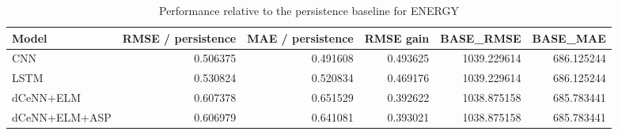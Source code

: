 \begin{table}
\caption{Performance relative to the persistence baseline for ENERGY}
\begin{tabular}{lrrrrr}
\toprule
Model & RMSE / persistence & MAE / persistence & RMSE gain & BASE\_RMSE & BASE\_MAE \\
\midrule
CNN & 0.506375 & 0.491608 & 0.493625 & 1039.229614 & 686.125244 \\
LSTM & 0.530824 & 0.520834 & 0.469176 & 1039.229614 & 686.125244 \\
dCeNN+ELM & 0.607378 & 0.651529 & 0.392622 & 1038.875158 & 685.783441 \\
dCeNN+ELM+ASP & 0.606979 & 0.641081 & 0.393021 & 1038.875158 & 685.783441 \\
\bottomrule
\end{tabular}
\end{table}
